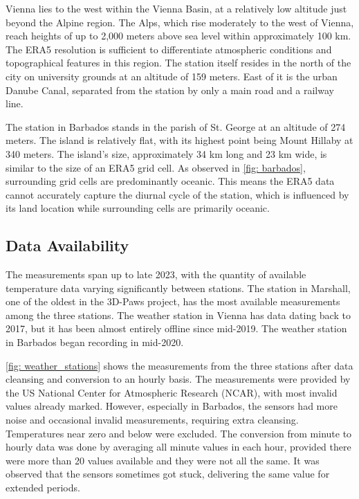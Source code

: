 Vienna lies to the west within the Vienna Basin, at a relatively low altitude just beyond the Alpine region. The Alps, which rise moderately to the west of Vienna, reach heights of up to 2,000 meters above sea level within approximately 100 km.
The ERA5 resolution is sufficient to differentiate atmospheric conditions and topographical features in this region.
The station itself resides in the north of the city on university grounds at an altitude of 159 meters.
East of it is the urban Danube Canal, separated from the station by only a main road and a railway line.

The station in Barbados stands in the parish of St. George at an altitude of 274 meters. The island is relatively flat, with its highest point being Mount Hillaby at 340 meters.
The island's size, approximately 34 km long and 23 km wide, is similar to the size of an ERA5 grid cell.
As observed in \autoref{fig: barbados}, surrounding grid cells are predominantly oceanic.
This means the ERA5 data cannot accurately capture the diurnal cycle of the station, which is influenced by its land location while surrounding cells are primarily oceanic.

\subsection{Data Availability}

The measurements span up to late 2023, with the quantity of available temperature data varying significantly between stations. The station in Marshall, one of the oldest in the 3D-Paws project, has the most available measurements among the three stations. The weather station in Vienna has data dating back to 2017, but it has been almost entirely offline since mid-2019. The weather station in Barbados began recording in mid-2020.

\autoref{fig: weather_stations} shows the measurements from the three stations after data cleansing and conversion to an hourly basis. The measurements were provided by the US National Center for Atmospheric Research (NCAR), with most invalid values already marked. However, especially in Barbados, the sensors had more noise and occasional invalid measurements, requiring extra cleansing. Temperatures near zero and below were excluded. The conversion from minute to hourly data was done by averaging all minute values in each hour, provided there were more than 20 values available and they were not all the same. It was observed that the sensors sometimes got stuck, delivering the same value for extended periods.

